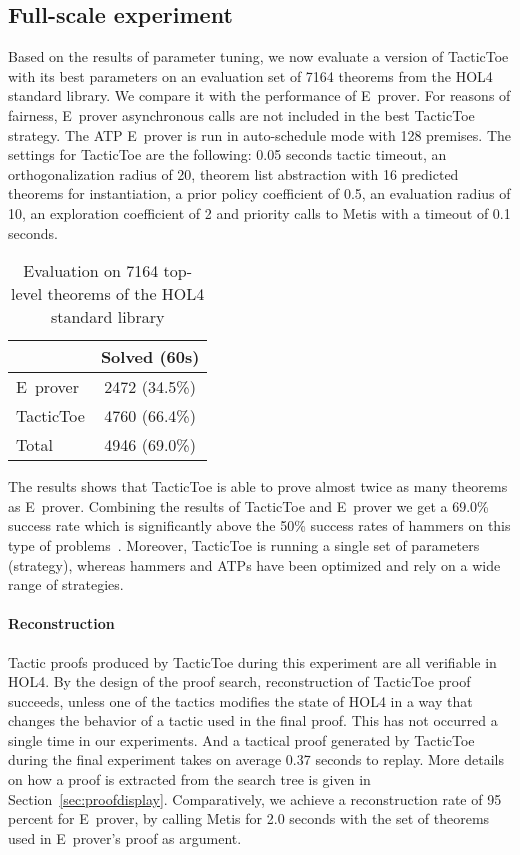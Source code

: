 \documentclass[runningheads,a4paper,draft]{svjour3}
\def\holfour{\textsf{HOL4}\xspace}
\def\eprover{\textsf{E~prover}\xspace}
\def\metis{\textsf{Metis}\xspace}
\def\tactictoe{\textsf{TacticToe}\xspace}
\newcommand{\ra}[1]{\renewcommand{\arraystretch}{#1}}
\begin{document}
\subsection{Full-scale experiment}\label{sec:full_exp}

Based on the results of parameter tuning, we now evaluate a version of
\tactictoe with its best parameters on an evaluation set of 7164 theorems from
the \holfour standard library. We compare it with the performance of \eprover.
For reasons of fairness, \eprover asynchronous calls are not included in the
best \tactictoe strategy. The ATP \eprover is run in auto-schedule mode with
128 premises. The settings for \tactictoe are the following:
0.05 seconds tactic timeout, an orthogonalization radius of 20, theorem list
abstraction with 16 predicted theorems for instantiation, a prior policy
coefficient of 0.5, an evaluation radius of 10, an exploration coefficient of 2
and priority calls to \metis with a timeout of 0.1 seconds.

\begin{table}[h!]
\centering\ra{1.3}
\begin{tabular}{lc}
\toprule
  & Solved (60s) \\
\midrule
   \eprover   & 2472 (34.5\%)\\
   \tactictoe & 4760 (66.4\%)\\
\midrule
   Total  & 4946 (69.0\%)\\
\bottomrule
\end{tabular}
\caption{\label{tab:_param} Evaluation on 7164 top-level theorems of the
\holfour standard library
}
\end{table}

The results shows that \tactictoe is able to prove almost twice as many
theorems as \eprover. Combining the results of \tactictoe and \eprover we get a
69.0\% success rate which is significantly above the 50\% success rates
of hammers on this type of problems~\cite{tgck-cpp15}. Moreover, \tactictoe is
running a single set of parameters (strategy), whereas hammers and ATPs have
been optimized and rely on a wide range of strategies.


\paragraph{Reconstruction}
Tactic proofs produced by \tactictoe during this experiment are all verifiable
in \holfour. By the design of the proof search, reconstruction of \tactictoe
proof succeeds, unless one of the tactics modifies the state of \holfour in a
way that changes the behavior of a tactic used in the final proof. This has not
occurred a single time in our experiments. And a tactical proof generated by
\tactictoe during the final experiment takes on average 0.37 seconds to replay.
More details on how a proof is extracted from the search tree is given in
Section~\ref{sec:proofdisplay}.
Comparatively, we achieve a reconstruction rate of 95 percent for \eprover,
by calling \metis for 2.0 seconds with the set of theorems used
in \eprover's proof as argument.
\end{document}
